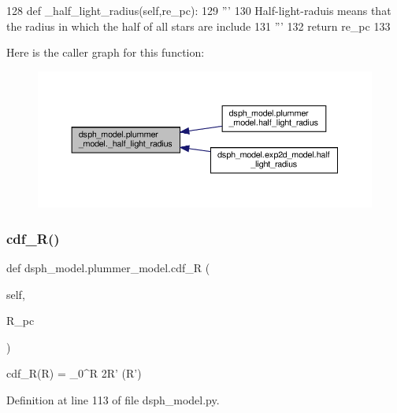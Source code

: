 \begin{DoxyCode}
128     \textcolor{keyword}{def }\_half\_light\_radius(self,re\_pc):
129         \textcolor{stringliteral}{'''}
130 \textcolor{stringliteral}{        Half-light-raduis means that the radius in which the half of all stars are include}
131 \textcolor{stringliteral}{        '''}
132         \textcolor{keywordflow}{return} re\_pc
133       
\end{DoxyCode}
Here is the caller graph for this function\+:\nopagebreak
\begin{figure}[H]
\begin{center}
\leavevmode
\includegraphics[width=350pt]{d4/d46/classdsph__model_1_1plummer__model_adabdd3103020e64743568b23f2fe1131_icgraph}
\end{center}
\end{figure}
\mbox{\label{classdsph__model_1_1plummer__model_a15987917b4f24a022349526405c49a81}} 
\subsubsection{\texorpdfstring{cdf\+\_\+\+R()}{cdf\_R()}}
{\footnotesize\ttfamily def dsph\+\_\+model.\+plummer\+\_\+model.\+cdf\+\_\+R (\begin{DoxyParamCaption}\item[{}]{self,  }\item[{}]{R\+\_\+pc }\end{DoxyParamCaption})}

\begin{DoxyVerb}cdf_R(R) = \int_0^R  2\pi R' \Sigma(R')
\end{DoxyVerb}
 

Definition at line 113 of file dsph\+\_\+model.\+py.


